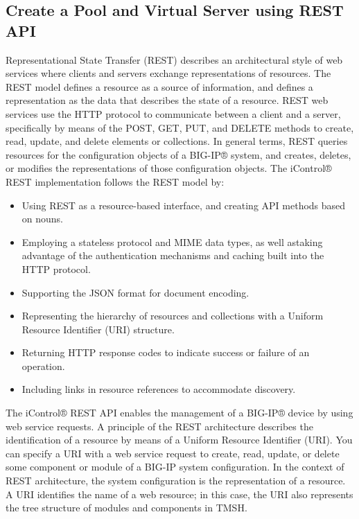 \documentclass[letterpaper,10pt,english]{sphinxmanual}
\begin{document}
\subsection{Create a Pool and Virtual Server using REST API}
\label{\detokenize{class1/module1/lab1::doc}}\label{\detokenize{class1/module1/lab1:create-a-pool-and-virtual-server-using-rest-api}}

Representational State Transfer (REST) describes an architectural style
of web services where clients and servers exchange representations of
resources. The REST model defines a resource as a source of information,
and defines a representation as the data that describes the state of a
resource. REST web services use the HTTP protocol to communicate between
a client and a server, specifically by means of the POST, GET, PUT, and
DELETE methods to create, read, update, and delete elements or
collections. In general terms, REST queries resources for the
configuration objects of a BIG-IP® system, and creates, deletes, or
modifies the representations of those configuration objects. The
iControl® REST implementation follows the REST model by:
\begin{itemize}
\item {} 
Using REST as a resource-based interface, and creating API methods
based on nouns.

\item {} 
Employing a stateless protocol and MIME data types, as well astaking advantage
of the authentication mechanisms and caching built into the HTTP protocol.

\item {} 
Supporting the JSON format for document encoding.

\item {} 
Representing the hierarchy of resources and collections with a Uniform
Resource Identifier (URI) structure.

\item {} 
Returning HTTP response codes to indicate success or failure of an
operation.

\item {} 
Including links in resource references to accommodate discovery.

\end{itemize}


The iControl® REST API enables the management of a BIG-IP® device by
using web service requests. A principle of the REST architecture
describes the identification of a resource by means of a Uniform
Resource Identifier (URI). You can specify a URI with a web service
request to create, read, update, or delete some component or module of a
BIG-IP system configuration. In the context of REST architecture, the
system configuration is the representation of a resource. A URI
identifies the name of a web resource; in this case, the URI also
represents the tree structure of modules and components in TMSH.
\end{document}
